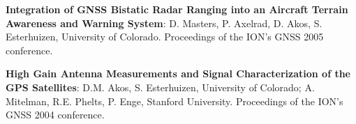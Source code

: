 \begin{resume}
{\bf Integration of GNSS Bistatic Radar Ranging into an Aircraft Terrain Awareness and Warning System}: D. Masters, P. Axelrad, D. Akos, S. Esterhuizen, University of Colorado. Proceedings of the ION's GNSS 2005 conference.


{\bf High Gain Antenna Measurements and Signal Characterization of the GPS Satellites}: D.M. Akos, S. Esterhuizen, University of Colorado; A. Mitelman, R.E. Phelts, P. Enge, Stanford University. Proceedings of the ION's GNSS 2004 conference.
\end{resume}


% 
